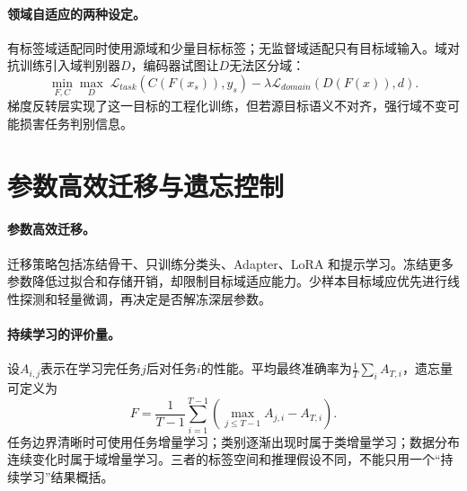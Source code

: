 \paragraph{领域自适应的两种设定。}
有标签域适配同时使用源域和少量目标标签；无监督域适配只有目标域输入。域对抗训练引入域判别器$D$，编码器试图让$D$无法区分域：
\begin{equation}
 \min_{F,C}\max_D\;\mathcal{L}_{task}(C(F(x_s)),y_s)-\lambda\mathcal{L}_{domain}(D(F(x)),d).
\end{equation}
梯度反转层实现了这一目标的工程化训练，但若源目标语义不对齐，强行域不变可能损害任务判别信息。

\section{参数高效迁移与遗忘控制}
\paragraph{参数高效迁移。}
迁移策略包括冻结骨干、只训练分类头、Adapter、LoRA 和提示学习。冻结更多参数降低过拟合和存储开销，却限制目标域适应能力。少样本目标域应优先进行线性探测和轻量微调，再决定是否解冻深层参数。

\begin{table}[htbp]
\centering
\caption{持续学习方法的知识保持与系统代价}
\scriptsize
\setlength{\tabcolsep}{3pt}
\end{table}

\paragraph{持续学习的评价量。}
设$A_{i,j}$表示在学习完任务$j$后对任务$i$的性能。平均最终准确率为$\frac1T\sum_iA_{T,i}$，遗忘量可定义为
\begin{equation}
 F=\frac1{T-1}\sum_{i=1}^{T-1}\left(\max_{j\leq T-1}A_{j,i}-A_{T,i}\right).
\end{equation}
任务边界清晰时可使用任务增量学习；类别逐渐出现时属于类增量学习；数据分布连续变化时属于域增量学习。三者的标签空间和推理假设不同，不能只用一个“持续学习”结果概括。

